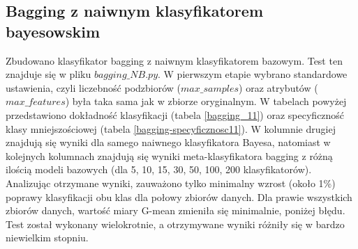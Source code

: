 \subsection{Bagging z naiwnym klasyfikatorem bayesowskim}
Zbudowano klasyfikator bagging z naiwnym klasyfikatorem bazowym. Test ten znajduje się w pliku $bagging\_NB.py$. W pierwszym etapie wybrano standardowe ustawienia, czyli liczebność podzbiorów ($max\_samples$) oraz atrybutów ($max\_features$) była taka sama jak w zbiorze oryginalnym.
W tabelach powyżej przedstawiono dokładność klasyfikacji (tabela \ref{bagging_11}) oraz specyficzność klasy mniejszościowej (tabela \ref{bagging-specyficznosc11}). W kolumnie drugiej znajdują się wyniki dla samego naiwnego klasyfikatora Bayesa, natomiast w kolejnych kolumnach znajdują się wyniki meta-klasyfikatora bagging z różną ilością modeli bazowych (dla 5, 10, 15, 30, 50, 100, 200 klasyfikatorów). Analizując otrzymane wyniki, zauważono tylko minimalny wzrost (około 1\%) poprawy klasyfikacji obu klas dla połowy zbiorów danych. Dla prawie wszystkich zbiorów danych, wartość miary G-mean zmieniła się minimalnie, poniżej błędu. Test został wykonany wielokrotnie, a otrzymywane wyniki różniły się w bardzo niewielkim stopniu. 
